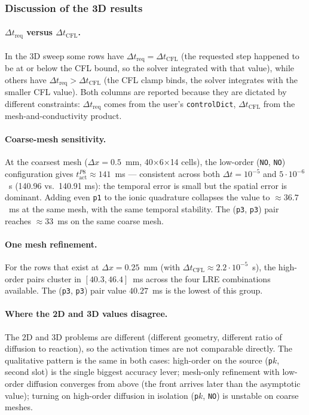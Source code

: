 \documentclass[11pt,a4paper]{article}
\newcommand{\code}[1]{\texttt{\small #1}}
\begin{document}
\subsubsection{Discussion of the 3D results}

\paragraph{$\Delta t_{\text{req}}$ versus $\Delta t_{\text{CFL}}$.}
In the 3D sweep some rows have
$\Delta t_{\text{req}} = \Delta t_{\text{CFL}}$ (the requested
step happened to be at or below the CFL bound, so the solver
integrated with that value), while others have
$\Delta t_{\text{req}} > \Delta t_{\text{CFL}}$ (the CFL clamp
binds, the solver integrates with the smaller CFL value). Both
columns are reported because they are dictated by different
constraints: $\Delta t_{\text{req}}$ comes from the user's
\code{controlDict}, $\Delta t_{\text{CFL}}$ from the
mesh-and-conductivity product.

\paragraph{Coarse-mesh sensitivity.}
At the coarsest mesh ($\Delta x = 0.5$~mm,
40$\times$6$\times$14 cells), the low-order (\code{NO},
\code{NO}) configuration gives $t_{\text{act}}^{P8} \approx 141$~ms
— consistent across both $\Delta t = 10^{-5}$ and $5\!\cdot\!10^{-6}$~s
(140.96 vs.\ 140.91 ms): the temporal error is small but the
spatial error is dominant. Adding even \code{p1} to the ionic
quadrature collapses the value to $\approx 36.7$~ms at the same
mesh, with the same temporal stability. The (\code{p3}, \code{p3})
pair reaches $\approx 33$~ms on the same coarse mesh.

\paragraph{One mesh refinement.}
For the rows that exist at $\Delta x = 0.25$~mm (with
$\Delta t_{\text{CFL}} \approx 2.2\!\cdot\!10^{-5}$~s), the
high-order pairs cluster in $[40.3, 46.4]$~ms across the four LRE
combinations available. The (\code{p3}, \code{p3}) pair value
$40.27$~ms is the lowest of this group.

\paragraph{Where the 2D and 3D values disagree.}
The 2D and 3D problems are different (different geometry, different
ratio of diffusion to reaction), so the activation times are not
comparable directly. The qualitative pattern is the same in both
cases: high-order on the source (\code{p}$k$, second slot) is the
single biggest accuracy lever; mesh-only refinement with low-order
diffusion converges from above (the front arrives later than the
asymptotic value); turning on high-order diffusion in isolation
(\code{p}$k$, \code{NO}) is unstable on coarse meshes.
\end{document}
